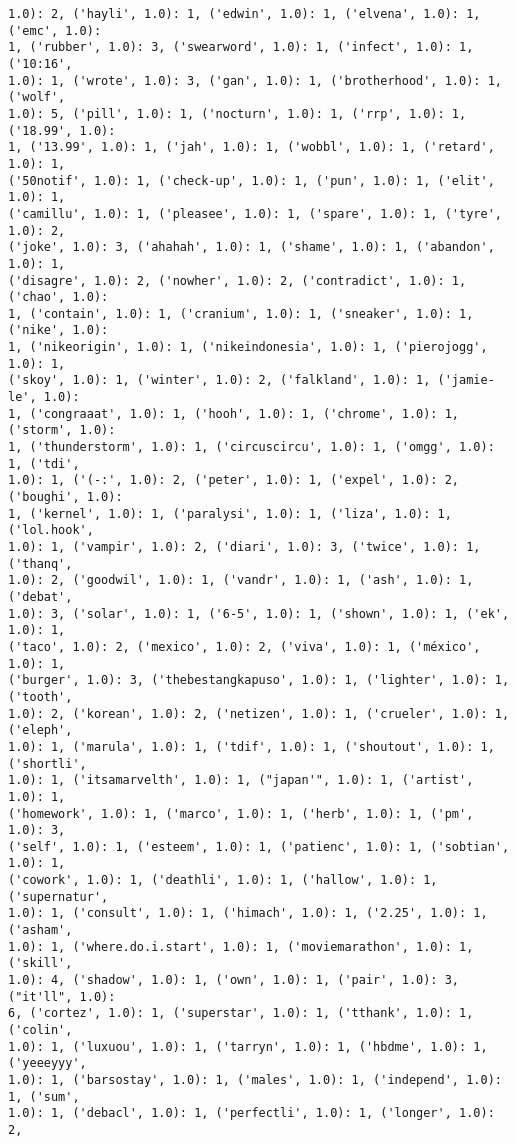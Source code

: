 \documentclass[11pt]{article}
\begin{document}
\begin{Verbatim}[commandchars=\\\{\}]
1.0): 2, ('hayli', 1.0): 1, ('edwin', 1.0): 1, ('elvena', 1.0): 1, ('emc', 1.0):
1, ('rubber', 1.0): 3, ('swearword', 1.0): 1, ('infect', 1.0): 1, ('10:16',
1.0): 1, ('wrote', 1.0): 3, ('gan', 1.0): 1, ('brotherhood', 1.0): 1, ('wolf',
1.0): 5, ('pill', 1.0): 1, ('nocturn', 1.0): 1, ('rrp', 1.0): 1, ('18.99', 1.0):
1, ('13.99', 1.0): 1, ('jah', 1.0): 1, ('wobbl', 1.0): 1, ('retard', 1.0): 1,
('50notif', 1.0): 1, ('check-up', 1.0): 1, ('pun', 1.0): 1, ('elit', 1.0): 1,
('camillu', 1.0): 1, ('pleasee', 1.0): 1, ('spare', 1.0): 1, ('tyre', 1.0): 2,
('joke', 1.0): 3, ('ahahah', 1.0): 1, ('shame', 1.0): 1, ('abandon', 1.0): 1,
('disagre', 1.0): 2, ('nowher', 1.0): 2, ('contradict', 1.0): 1, ('chao', 1.0):
1, ('contain', 1.0): 1, ('cranium', 1.0): 1, ('sneaker', 1.0): 1, ('nike', 1.0):
1, ('nikeorigin', 1.0): 1, ('nikeindonesia', 1.0): 1, ('pierojogg', 1.0): 1,
('skoy', 1.0): 1, ('winter', 1.0): 2, ('falkland', 1.0): 1, ('jamie-le', 1.0):
1, ('congraaat', 1.0): 1, ('hooh', 1.0): 1, ('chrome', 1.0): 1, ('storm', 1.0):
1, ('thunderstorm', 1.0): 1, ('circuscircu', 1.0): 1, ('omgg', 1.0): 1, ('tdi',
1.0): 1, ('(-:', 1.0): 2, ('peter', 1.0): 1, ('expel', 1.0): 2, ('boughi', 1.0):
1, ('kernel', 1.0): 1, ('paralysi', 1.0): 1, ('liza', 1.0): 1, ('lol.hook',
1.0): 1, ('vampir', 1.0): 2, ('diari', 1.0): 3, ('twice', 1.0): 1, ('thanq',
1.0): 2, ('goodwil', 1.0): 1, ('vandr', 1.0): 1, ('ash', 1.0): 1, ('debat',
1.0): 3, ('solar', 1.0): 1, ('6-5', 1.0): 1, ('shown', 1.0): 1, ('ek', 1.0): 1,
('taco', 1.0): 2, ('mexico', 1.0): 2, ('viva', 1.0): 1, ('méxico', 1.0): 1,
('burger', 1.0): 3, ('thebestangkapuso', 1.0): 1, ('lighter', 1.0): 1, ('tooth',
1.0): 2, ('korean', 1.0): 2, ('netizen', 1.0): 1, ('crueler', 1.0): 1, ('eleph',
1.0): 1, ('marula', 1.0): 1, ('tdif', 1.0): 1, ('shoutout', 1.0): 1, ('shortli',
1.0): 1, ('itsamarvelth', 1.0): 1, ("japan'", 1.0): 1, ('artist', 1.0): 1,
('homework', 1.0): 1, ('marco', 1.0): 1, ('herb', 1.0): 1, ('pm', 1.0): 3,
('self', 1.0): 1, ('esteem', 1.0): 1, ('patienc', 1.0): 1, ('sobtian', 1.0): 1,
('cowork', 1.0): 1, ('deathli', 1.0): 1, ('hallow', 1.0): 1, ('supernatur',
1.0): 1, ('consult', 1.0): 1, ('himach', 1.0): 1, ('2.25', 1.0): 1, ('asham',
1.0): 1, ('where.do.i.start', 1.0): 1, ('moviemarathon', 1.0): 1, ('skill',
1.0): 4, ('shadow', 1.0): 1, ('own', 1.0): 1, ('pair', 1.0): 3, ("it'll", 1.0):
6, ('cortez', 1.0): 1, ('superstar', 1.0): 1, ('tthank', 1.0): 1, ('colin',
1.0): 1, ('luxuou', 1.0): 1, ('tarryn', 1.0): 1, ('hbdme', 1.0): 1, ('yeeeyyy',
1.0): 1, ('barsostay', 1.0): 1, ('males', 1.0): 1, ('independ', 1.0): 1, ('sum',
1.0): 1, ('debacl', 1.0): 1, ('perfectli', 1.0): 1, ('longer', 1.0): 2,

\end{Verbatim}
\end{document}
